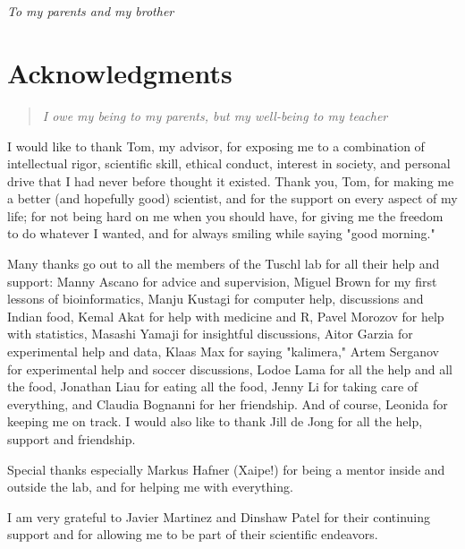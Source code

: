 \documentclass[12pt]{rockefeller}
\begin{document}
\chapter*{} %
\addtocounter{page}{2} %
\vspace{3in} %
\begin{flushright} %
\emph{To my parents and my brother}
\end{flushright}

\chapter*{Acknowledgments} %
\begin{quote}
\textit{I owe my being to my parents, but my well-being to my teacher}
\end{quote}
I would like to thank Tom, my advisor, for exposing me to a combination of intellectual rigor, scientific skill, ethical conduct, interest in society, and personal drive that I had never before thought it existed. Thank you, Tom, for making me a better (and hopefully good) scientist, and for the support on every aspect of my life; for not being hard on me when you should have, for giving me the freedom to do whatever I wanted, and for always smiling while saying "good morning." 

Many thanks go out to all the members of the Tuschl lab for all their help and support: Manny Ascano for advice and supervision, Miguel Brown for my first lessons of bioinformatics, Manju Kustagi for computer help, discussions and Indian food, Kemal Akat for help with medicine and R, Pavel Morozov for help with statistics, Masashi Yamaji for insightful discussions, Aitor Garzia for experimental help and data, Klaas Max for saying "kalimera," Artem Serganov for experimental help and soccer discussions, Lodoe Lama for all the help and all the food, Jonathan Liau for eating all the food, Jenny Li for taking care of everything, and Claudia Bognanni for her friendship. And of course, Leonida for keeping me on track. 
I would also like to thank Jill de Jong for all the help, support and friendship. 

Special thanks especially Markus Hafner (Xaipe!) for being a mentor inside and outside the lab, and for helping me with everything. 

I am very grateful to Javier Martinez and Dinshaw Patel for their continuing support and for allowing me to be part of their scientific endeavors.
\end{document}
